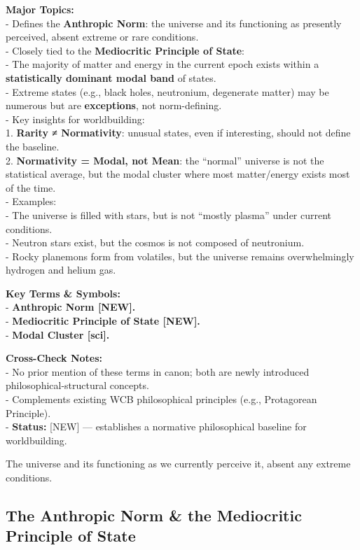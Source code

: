 \documentclass[
  letterpaper,
]{book}
\begin{document}
\textbf{Major Topics:}\\
- Defines the \textbf{Anthropic Norm}: the universe and its functioning
as presently perceived, absent extreme or rare conditions.\\
- Closely tied to the \textbf{Mediocritic Principle of State}:\\
- The majority of matter and energy in the current epoch exists within a
\textbf{statistically dominant modal band} of states.\\
- Extreme states (e.g., black holes, neutronium, degenerate matter) may
be numerous but are \textbf{exceptions}, not norm-defining.\\
- Key insights for worldbuilding:\\
1. \textbf{Rarity ≠ Normativity}: unusual states, even if interesting,
should not define the baseline.\\
2. \textbf{Normativity = Modal, not Mean}: the ``normal'' universe is
not the statistical average, but the modal cluster where most
matter/energy exists most of the time.\\
- Examples:\\
- The universe is filled with stars, but is not ``mostly plasma'' under
current conditions.\\
- Neutron stars exist, but the cosmos is not composed of neutronium.\\
- Rocky planemons form from volatiles, but the universe remains
overwhelmingly hydrogen and helium gas.

\textbf{Key Terms \& Symbols:}\\
- \textbf{Anthropic Norm {[}NEW{]}.}\\
- \textbf{Mediocritic Principle of State {[}NEW{]}.}\\
- \textbf{Modal Cluster {[}sci{]}.}

\textbf{Cross-Check Notes:}\\
- No prior mention of these terms in canon; both are newly introduced
philosophical-structural concepts.\\
- Complements existing WCB philosophical principles (e.g., Protagorean
Principle).\\
- \textbf{Status:} {[}NEW{]} --- establishes a normative philosophical
baseline for worldbuilding.

The universe and its functioning as we currently perceive it, absent any
extreme conditions.

\subsection{The Anthropic Norm \& the Mediocritic Principle of
State}\label{the-anthropic-norm-the-mediocritic-principle-of-state}
\end{document}
